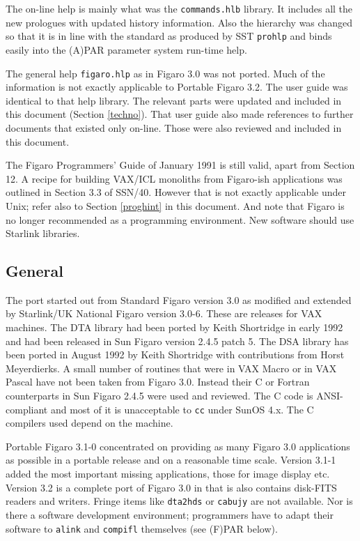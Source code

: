 The on-line help is mainly what was the {\tt commands.hlb} library. It
includes all the new prologues with updated history information. Also
the hierarchy was changed so that it is in line with the standard as
produced by SST {\tt prohlp} and binds easily into the (A)PAR parameter
system run-time help.

The general help {\tt figaro.hlp} as in Figaro 3.0 was not ported. Much
of the information is not exactly applicable to Portable Figaro 3.2. The
user guide was identical to that help library. The relevant parts were
updated and included in this document (Section \ref{techno}). That user
guide also made references to further documents that existed only
on-line. Those were also reviewed and included in this document.

The Figaro Programmers' Guide of January 1991 is still valid, apart from
Section 12. A recipe for building VAX/ICL monoliths from Figaro-ish
applications was outlined in Section 3.3 of SSN/40. However that is not
exactly applicable under Unix; refer also to Section \ref{proghint} in
this document.  And note that Figaro is no longer recommended as a
programming environment. New software should use Starlink libraries.


\subsection{General}

The port started out from Standard Figaro version 3.0 as modified and
extended by Starlink/UK National Figaro version 3.0-6. These are
releases for VAX machines. The DTA library had been ported by Keith
Shortridge in early 1992 and had been released in Sun Figaro version
2.4.5 patch 5. The DSA library has been ported in August 1992 by Keith
Shortridge with contributions from Horst Meyerdierks. A small number of
routines that were in VAX Macro or in VAX Pascal have not been taken
from Figaro 3.0. Instead their C or Fortran counterparts in Sun Figaro
2.4.5 were used and reviewed. The C code is ANSI-compliant and most of
it is unacceptable to {\tt cc} under SunOS 4.x.  The C compilers used
depend on the machine.

Portable Figaro 3.1-0 concentrated on providing as many Figaro 3.0
applications as possible in a portable release and on a reasonable time
scale.  Version 3.1-1 added the most important missing applications,
those for image display etc.  Version 3.2 is a complete port of Figaro
3.0 in that is also contains disk-FITS readers and writers.  Fringe
items like {\tt dta2hds} or {\tt cabujy} are not available. Nor is there
a software development environment; programmers have to adapt their
software to {\tt alink} and {\tt compifl} themselves (see (F)PAR below).

